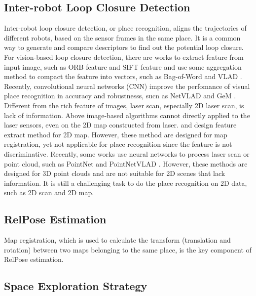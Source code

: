 \label{sec:relatedwork}

\subsection{Inter-robot Loop Closure Detection}
Inter-robot loop closure detection, or place recognition, aligns the trajectories of different robots, based on the sensor frames in the same place. 
It is a common way to generate and compare descriptors to find out the potential loop closure.
For vision-based loop closure detection, there are works to extract feature from input image, such as ORB feature\cite{Mur-Artal:2017281} and SIFT feature \cite{lowe2004distinctive} and use some aggregation method to compact the feature into vectors, such as Bag-of-Word \cite{jegou2011aggregating} and VLAD \cite{tolias2013aggregate}.
Recently, convolutional neural networks (CNN) improve the perfomance of visual place recognition in accuracy and robustnesss, sucn as NetVLAD \cite{arandjelovic2016netvlad} and GeM \cite{radenovic2018fine}.
Different from the rich feature of images, laser scan, especially 2D laser scan, is lack of information. Above image-based algorithms cannot directly applied to the laser sensors, even on the  2D map constructed from laser.
\cite{ribenren1} and \cite{ribenren2} design feature extract method for 2D map. 
However, these method are designed for map registration, yet not applicable for place recognition since the feature is not discriminative.
Recently, some works use neural networks to process laser scan or point cloud, such as PointNet \cite{qi2017pointnet} and PointNetVLAD \cite{angelina2018pointnetvlad}. However, these methods are designed for 3D point clouds and are not suitable for 2D scenes that lack information.
It is still a challenging task to do the place recognition on 2D data, such as 2D scan and 2D map.

\subsection{RelPose Estimation}
Map registration, which is used to calculate the transform (translation and rotation) between two maps belonging to the same place, is the key component of RelPose estimation.

\subsection{Space Exploration Strategy}
